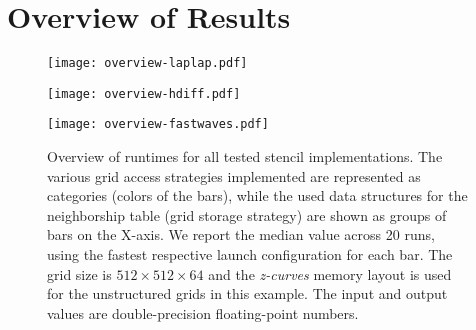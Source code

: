\section{Overview of Results}

\begin{figure}
	\begin{center}
	    \texttt{[image: overview-laplap.pdf]}
    
	    \vspace{0.5cm}
    
	    \texttt{[image: overview-hdiff.pdf]}
    
	    \vspace{0.5cm}
    
	    \texttt{[image: overview-fastwaves.pdf]}
		
    \end{center}
    \caption{\label{fig:storage-access} Overview of runtimes for all tested stencil implementations. The various grid access strategies implemented are represented as categories (colors of the bars), while the used data structures for the neighborship table (grid storage strategy) are shown as groups of bars on the X-axis. We report the median value across 20 runs, using the fastest respective launch configuration for each bar. The grid size is $512\times512\times 64$ and the \emph{z-curves} memory layout is used for the unstructured grids in this example. The input and output values are double-precision floating-point numbers.}
\end{figure}

